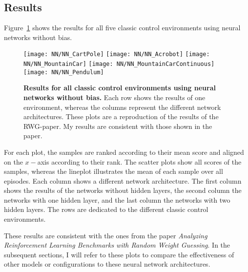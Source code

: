 \subsection{Results}
Figure~\ref{fig:results_NN} shows the results for all five classic control environments using neural networks without bias.
\begin{figure}[!ht]
  \centering
  \texttt{[image: NN/NN\_CartPole]}
  \texttt{[image: NN/NN\_Acrobot]}
  \texttt{[image: NN/NN\_MountainCar]}
  \texttt{[image: NN/NN\_MountainCarContinuous]}
  \texttt{[image: NN/NN\_Pendulum]}
\caption[Results for all classic control environments using neural networks without bias]{
  \textbf{Results for all classic control environments using neural networks without bias.}
   Each row shows the results of one environment, whereas the columns represent the different network architectures. These plots are a reproduction of the results of the RWG-paper. My results are consistent with those shown in the paper.
}
\label{fig:results_NN}
\end{figure}
For each plot, the samples are ranked according to their mean score and aligned on the $x-$axis according to their rank. The scatter plots show all scores of the samples, whereas the lineplot illustrates the mean of each sample over all episodes. Each column shows a different network architecture. The first column shows the results of the networks without hidden layers, the second column the networks with one hidden layer, and the last column the networks with two hidden layers. The rows are dedicated to the different classic control environments.

These results are consistent with the ones from the paper \emph{Analyzing Reinforcement Learning Benchmarks with Random Weight Guessing}. In the subsequent sections, I will refer to these plots to compare the effectiveness of other models or configurations to these neural network architectures.

